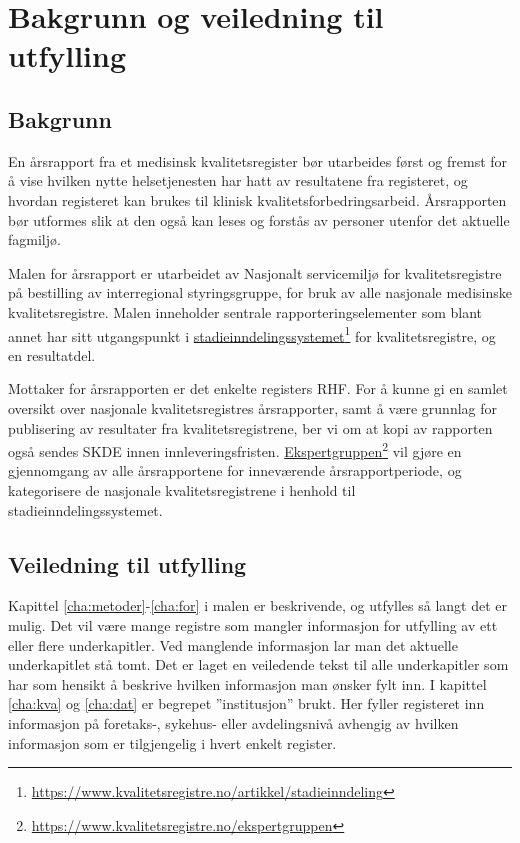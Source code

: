 \documentclass[norsk, a4paper, twocolumn]{report}
\begin{document}
\chapter*{Bakgrunn og veiledning til utfylling}


\section*{Bakgrunn}
En årsrapport fra et medisinsk kvalitetsregister bør utarbeides først og
fremst for å vise hvilken nytte helsetjenesten har hatt av resultatene fra
registeret, og
hvordan registeret kan brukes til klinisk kvalitetsforbedringsarbeid.
Årsrapporten bør utformes slik
at den også kan leses og forstås av personer utenfor det aktuelle fagmiljø.

Malen for årsrapport er utarbeidet av Nasjonalt servicemiljø for
kvalitetsregistre på bestilling av interregional styringsgruppe, for bruk av alle
nasjonale medisinske kvalitetsregistre. Malen inneholder sentrale
rapporteringselementer som blant annet har sitt utgangspunkt i
\href{https://www.kvalitetsregistre.no/artikkel/stadieinndeling}{stadieinndelingssystemet}\footnote{\url{https://www.kvalitetsregistre.no/artikkel/stadieinndeling}}
for kvalitetsregistre, og en resultatdel.

Mottaker for årsrapporten er det enkelte registers RHF. For å kunne gi en
samlet oversikt over nasjonale kvalitetsregistres
årsrapporter, samt å være grunnlag for publisering av resultater fra
kvalitetsregistrene, ber vi om at kopi av rapporten også sendes SKDE innen
innleveringsfristen.
\href{https://www.kvalitetsregistre.no/ekspertgruppen}{Ekspertgruppen}\footnote{\url{https://www.kvalitetsregistre.no/ekspertgruppen}}
vil gjøre en gjennomgang av alle årsrapportene for inneværende
årsrapportperiode, og kategorisere de nasjonale kvalitetsregistrene i henhold
til stadieinndelingssystemet.


\section*{Veiledning til utfylling}
Kapittel \ref{cha:metoder}-\ref{cha:for} i malen er beskrivende, og utfylles så
langt det er mulig. Det vil
være mange registre som mangler informasjon for utfylling av ett eller flere
underkapitler. Ved manglende informasjon lar man det aktuelle underkapitlet
stå tomt. Det er laget en veiledende tekst til alle underkapitler som har
som hensikt å beskrive hvilken informasjon man ønsker fylt inn. I kapittel
\ref{cha:kva} og \ref{cha:dat}
er begrepet ”institusjon” brukt. Her fyller registeret inn informasjon på
foretaks-, sykehus- eller avdelingsnivå avhengig av hvilken informasjon som
er tilgjengelig i hvert enkelt register. 
\end{document}
